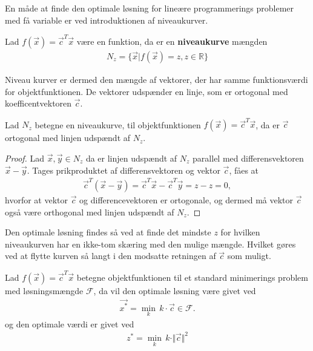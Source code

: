 En måde at finde den optimale løsning for lineære programmerings problemer med få variable er ved introduktionen af niveaukurver.
\begin{defn}[Niveaukurver]
Lad $f(\vec{x})= \vec{c}^T\vec{x}$ være en funktion, da er en \textbf{niveaukurve} mængden 
\begin{align*}
N_z = \{\vec{x}| f(\vec{x}) = z, z \in \mathds{R}\}
\end{align*}
\end{defn}
Niveau kurver er dermed den mængde af vektorer, der har samme funktionsværdi for objektfunktionen. 
De vektorer udspænder en linje, som er ortogonal med koefficentvektoren $\vec{c}$.
\begin{stn}
Lad $N_z$ betegne en niveaukurve, til objektfunktionen $f(\vec{x})= \vec{c}^T\vec{x}$, da er $\vec{c}$ ortogonal med linjen udspændt af $N_z$.
\end{stn}
\begin{proof}
Lad $\vec{x}, \vec{y} \in N_z$ da er linjen udspændt af $N_z$ parallel med differensvektoren $\vec{x}-\vec{y}$.
Tages prikproduktet af differensvektoren og vektor $\vec{c}$, fåes at
\begin{align*}
\vec{c}^T(\vec{x}-\vec{y}) = \vec{c}^T\vec{x} -\vec{c}^T\vec{y} = z - z = 0,
\end{align*}
hvorfor at vektor $\vec{c}$ og differencevektoren er ortogonale, og dermed må vektor $\vec{c}$ også være orthogonal med linjen udspændt af $N_z$.
\end{proof}
Den optimale løsning findes så ved at finde det mindste $z$ for hvilken niveaukurven har en ikke-tom skæring med den mulige mængde. 
Hvilket gøres ved at flytte kurven så langt i den modsatte retningen af $\vec{c}$ som muligt.
\begin{stn}
Lad $f(\vec{x})=\vec{c}^T\vec{x}$ betegne objektfunktionen til et standard minimerings problem med løsningsmængde $\mathcal{F}$, da vil den optimale løsning være givet ved 
\begin{align*}
\vec{x^*}=\underset{k}{\min} \, k \cdot \vec{c} \in \mathcal{F}.
\end{align*}
og den optimale værdi er givet ved
\begin{align*}
z^* = \underset{k}{\min} \, k \cdot \Vert \vec{c} \Vert ^2
\end{align*}
\label{stn:niveau}
\end{stn}
